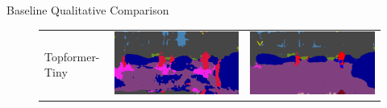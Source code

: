 \documentclass{lib/curtin_format}
\begin{document}
\begin{frame}{Baseline Qualitative Comparison}
\begin{figure}[]
\begin{tabular}{lll}
            Topformer-Tiny & \includegraphics[width=.3\linewidth]{res/lightweight-uda-baseline-qualitative/topformer-tiny-sourceonly.png} & \includegraphics[width=.3\linewidth]{res/lightweight-uda-baseline-qualitative/topformer-tiny-selftraining.png} \\
        \end{tabular}
    \end{figure}
\end{frame}
\end{document}
